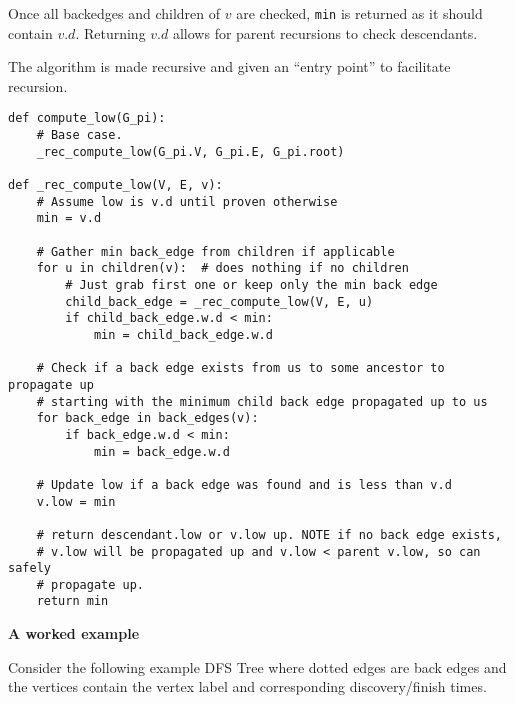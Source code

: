 \documentclass{article}
\begin{document}
Once all backedges and children of $v$ are checked, \texttt{min} is returned as
it should contain $v.d$. Returning $v.d$ allows for parent recursions to check
descendants. 

The algorithm is made recursive and given an ``entry point'' to facilitate 
recursion. 

\begin{verbatim}
def compute_low(G_pi):
    # Base case.
    _rec_compute_low(G_pi.V, G_pi.E, G_pi.root)

def _rec_compute_low(V, E, v):
    # Assume low is v.d until proven otherwise
    min = v.d

    # Gather min back_edge from children if applicable
    for u in children(v):  # does nothing if no children
        # Just grab first one or keep only the min back edge
        child_back_edge = _rec_compute_low(V, E, u)
        if child_back_edge.w.d < min:
            min = child_back_edge.w.d

    # Check if a back edge exists from us to some ancestor to propagate up
    # starting with the minimum child back edge propagated up to us
    for back_edge in back_edges(v):
        if back_edge.w.d < min: 
            min = back_edge.w.d

    # Update low if a back edge was found and is less than v.d
    v.low = min
    
    # return descendant.low or v.low up. NOTE if no back edge exists, 
    # v.low will be propagated up and v.low < parent v.low, so can safely
    # propagate up. 
    return min
\end{verbatim}


\textbf{A worked example}

Consider the following example DFS Tree where dotted edges are back edges and 
the vertices contain the vertex label and corresponding discovery/finish times. 
\end{document}
